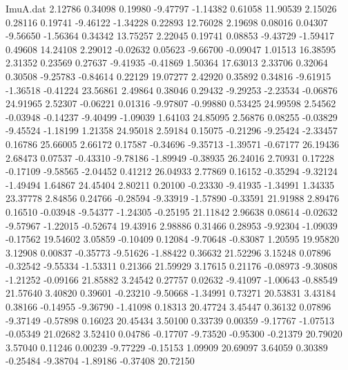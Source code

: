 \begin{filecontents}{ImuA.dat}
   2.12786    0.34098    0.19980   -9.47797   -1.14382    0.61058   11.90539
   2.15026    0.28116    0.19741   -9.46122   -1.34228    0.22893   12.76028
   2.19698    0.08016    0.04307   -9.56650   -1.56364    0.34342   13.75257
   2.22045    0.19741    0.08853   -9.43729   -1.59417    0.49608   14.24108
   2.29012   -0.02632    0.05623   -9.66700   -0.09047    1.01513   16.38595
   2.31352    0.23569    0.27637   -9.41935   -0.41869    1.50364   17.63013
   2.33706    0.32064    0.30508   -9.25783   -0.84614    0.22129   19.07277
   2.42920    0.35892    0.34816   -9.61915   -1.36518   -0.41224   23.56861
   2.49864    0.38046    0.29432   -9.29253   -2.23534   -0.06876   24.91965
   2.52307   -0.06221    0.01316   -9.97807   -0.99880    0.53425   24.99598
   2.54562   -0.03948   -0.14237   -9.40499   -1.09039    1.64103   24.85095
   2.56876    0.08255   -0.03829   -9.45524   -1.18199    1.21358   24.95018
   2.59184    0.15075   -0.21296   -9.25424   -2.33457    0.16786   25.66005
   2.66172    0.17587   -0.34696   -9.35713   -1.39571   -0.67177   26.19436
   2.68473    0.07537   -0.43310   -9.78186   -1.89949   -0.38935   26.24016
   2.70931    0.17228   -0.17109   -9.58565   -2.04452    0.41212   26.04933
   2.77869    0.16152   -0.35294   -9.32124   -1.49494    1.64867   24.45404
   2.80211    0.20100   -0.23330   -9.41935   -1.34991    1.34335   23.37778
   2.84856    0.24766   -0.28594   -9.33919   -1.57890   -0.33591   21.91988
   2.89476    0.16510   -0.03948   -9.54377   -1.24305   -0.25195   21.11842
   2.96638    0.08614   -0.02632   -9.57967   -1.22015   -0.52674   19.43916
   2.98886    0.31466    0.28953   -9.92304   -1.09039   -0.17562   19.54602
   3.05859   -0.10409    0.12084   -9.70648   -0.83087    1.20595   19.95820
   3.12908    0.00837   -0.35773   -9.51626   -1.88422    0.36632   21.52296
   3.15248    0.07896   -0.32542   -9.55334   -1.53311    0.21366   21.59929
   3.17615    0.21176   -0.08973   -9.30808   -1.21252   -0.09166   21.85882
   3.24542    0.27757    0.02632   -9.41097   -1.00643   -0.88549   21.57640
   3.40820    0.39601   -0.23210   -9.50668   -1.34991    0.73271   20.53831
   3.43184    0.38166   -0.14955   -9.36790   -1.41098    0.18313   20.47724
   3.45447    0.36132    0.07896   -9.37149   -0.57898    0.16023   20.45434
   3.50100    0.33739    0.00359   -9.17767   -1.07513   -0.05349   21.02682
   3.52410    0.04786   -0.17707   -9.73520   -0.95300   -0.21379   20.79020
   3.57040    0.11246    0.00239   -9.77229   -0.15153    1.09909   20.69097
   3.64059    0.30389   -0.25484   -9.38704   -1.89186   -0.37408   20.72150

\end{filecontents}
